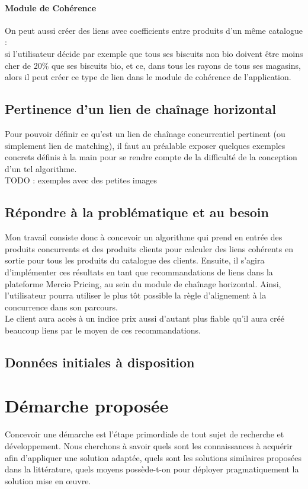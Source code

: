 \documentclass{rapportCS}
\begin{document}
\paragraph{Module de Cohérence}
On peut aussi créer des liens avec coefficients entre produits d'un même catalogue : \\
si l'utilisateur décide par exemple que tous ses biscuits non 
bio doivent être moins cher de 20\% que ses biscuits bio,
et ce, dans tous les rayons de tous ses magasins, alors il peut créer ce type de lien 
dans le module de cohérence de l'application.

\subsection{Pertinence d'un lien de chaînage horizontal}
Pour pouvoir définir ce qu'est un lien de chaînage concurrentiel pertinent 
(ou simplement lien de matching), il faut au préalable exposer quelques exemples concrets 
définis à la main pour se rendre compte de la difficulté de la conception 
d'un tel algorithme. \\

TODO : exemples avec des petites images

\subsection{Répondre à la problématique et au besoin}
Mon travail consiste donc à concevoir un algorithme qui prend en entrée des produits concurrents et 
des produits clients pour calculer des liens cohérents en sortie pour tous les produits du catalogue des clients.
Ensuite, il s'agira d'implémenter ces résultats en tant que recommandations de liens dans la
plateforme Mercio Pricing, au sein du module de chaînage horizontal. 
Ainsi, l'utilisateur pourra utiliser le plus tôt possible la règle
d'alignement à la concurrence dans son parcours. \\
Le client aura accès à un indice prix aussi d'autant plus fiable
qu'il aura créé beaucoup liens par le moyen de ces recommandations.\\

\subsection{Données initiales à disposition}

\newpage

\section{Démarche proposée}
Concevoir une démarche est l'étape primordiale de tout sujet de recherche et développement.
Nous cherchons à savoir quels sont les connaissances à acquérir afin d'appliquer une solution adaptée,
quels sont les solutions similaires proposées dans la littérature, quels moyens possède-t-on pour
déployer pragmatiquement la solution mise en œuvre.\\
\end{document}
